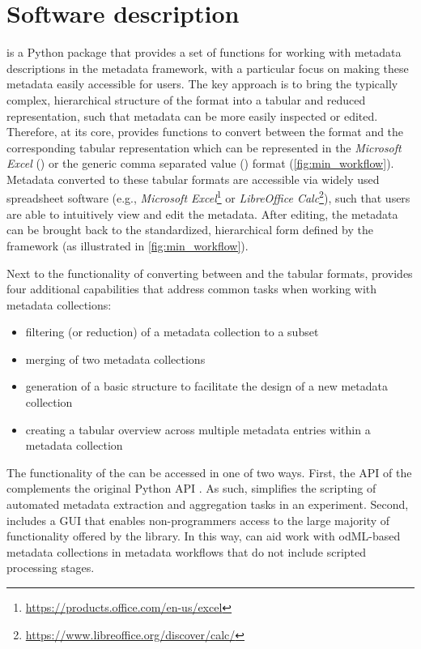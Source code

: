 \section{Software description}
\label{sec:Software}

 is a Python package that provides a set of functions for working with metadata descriptions in the  metadata framework, with a particular focus on making these metadata easily accessible for users. The key approach is to bring the typically complex, hierarchical structure of the  format into a tabular and reduced  representation, such that metadata can be more easily inspected or edited. Therefore, at its core,  provides functions to convert between the  format and the corresponding tabular representation which can be represented in the \textit{Microsoft Excel} () or the generic comma separated value () format (\cref{fig:min_workflow}). Metadata converted to these tabular formats are accessible via widely used spreadsheet software (e.g., \textit{Microsoft Excel}\footnote{\url{https://products.office.com/en-us/excel}} or \textit{LibreOffice Calc}\footnote{\url{https://www.libreoffice.org/discover/calc/}}), such that users are able to intuitively view and edit the metadata. After editing, the metadata can be brought back to the standardized, hierarchical form defined by the  framework (as illustrated in \cref{fig:min_workflow}).

Next to the functionality of converting between  and the tabular formats,  provides four additional capabilities that address common tasks when working with metadata collections:
\begin{itemize}
    \item filtering (or reduction) of a metadata collection to a subset
    \item merging of two metadata collections
    \item generation of a basic  structure to facilitate the design of a new metadata collection
    \item creating a tabular overview across multiple metadata entries within a metadata collection
\end{itemize}

The functionality of the  can be accessed in one of two ways. First, the API of the  complements the original Python  API \citep{Grewe_2011}. As such,  simplifies the scripting of automated metadata extraction and aggregation tasks in an experiment. Second,  includes a GUI that enables non-programmers access to the large majority of functionality offered by the library. In this way,  can aid work with odML-based metadata collections in metadata workflows that do not include scripted processing stages.

